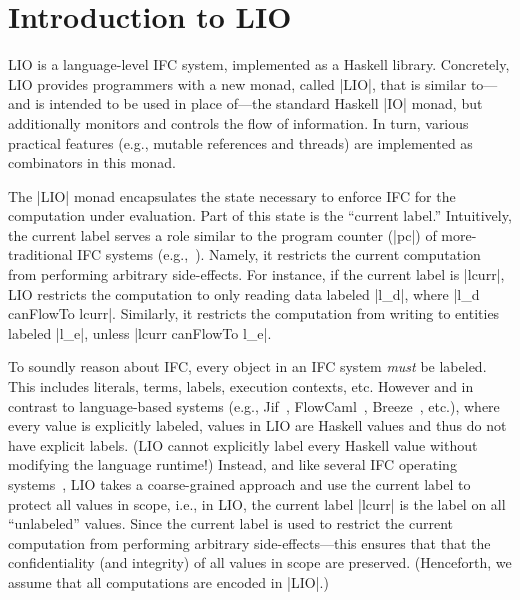 \section{Introduction to LIO}
\label{sec:background}

LIO is a language-level IFC system, implemented as a Haskell
library.
%
Concretely, LIO provides programmers with a new monad, called |LIO|,
that is similar to---and is intended to be used in place of---the
standard Haskell |IO| monad, but additionally monitors and controls
the flow of information.
%
In turn, various practical features (e.g., mutable references and
threads) are implemented as combinators in this monad.
%

The |LIO| monad encapsulates the state necessary to enforce IFC for
the computation under evaluation.
%
Part of this state is the ``current label.''
%
Intuitively, the current label serves a role similar to the program
counter (|pc|) of more-traditional IFC systems
(e.g.,~\cite{FlowCaml}).
%
Namely, it restricts the current computation from performing arbitrary
side-effects.
%
For instance, if the current label is |lcurr|, LIO restricts the
computation to only reading data labeled |l_d|, where |l_d canFlowTo
lcurr|.
%
Similarly, it restricts the computation from writing to entities
labeled |l_e|, unless |lcurr canFlowTo l_e|.

To soundly reason about IFC, every object in an IFC system \emph{must}
be labeled.
%
This includes literals, terms, labels, execution contexts, etc.
%
However and in contrast to language-based systems (e.g.,
Jif~\cite{myers:jif}, FlowCaml~\cite{FlowCaml}, Breeze~\cite{Breeze},
etc.), where every value is explicitly labeled, values in LIO are
Haskell values and thus do not have explicit labels.
%
(LIO cannot explicitly label every Haskell value without modifying the
language runtime!)
%
Instead, and like several IFC operating
systems~\cite{efstathopoulos:asbestos,zeldovich:histar}, LIO takes a
coarse-grained approach and use the current label to protect all
values in scope, i.e., in LIO, the current label |lcurr| is the label
on all ``unlabeled'' values.
%
Since the current label is used to restrict the current computation
from performing arbitrary side-effects---this ensures that that the
confidentiality (and integrity) of all values in scope are preserved.
%
(Henceforth, we assume that all computations are encoded in |LIO|.)

